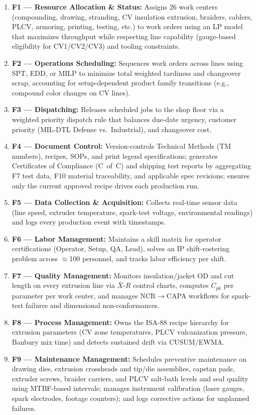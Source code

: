 \documentclass[11pt]{article}
\begin{document}
\begin{enumerate}[leftmargin=1.8em, itemsep=1pt]
\item \textbf{F1 --- Resource Allocation \& Status:} Assigns 26 work centers (compounding, drawing, stranding, CV insulation extrusion, braiders, cablers, PLCV, armoring, printing, testing, etc.) to work orders using an LP model that maximizes throughput while respecting line capability (gauge-based eligibility for CV1/CV2/CV3) and tooling constraints.
\item \textbf{F2 --- Operations Scheduling:} Sequences work orders across lines using SPT, EDD, or MILP to minimize total weighted tardiness and changeover scrap, accounting for setup-dependent product family transitions (e.g., compound color changes on CV lines).
\item \textbf{F3 --- Dispatching:} Releases scheduled jobs to the shop floor via a weighted priority dispatch rule that balances due-date urgency, customer priority (MIL-DTL Defense vs.\ Industrial), and changeover cost.
\item \textbf{F4 --- Document Control:} Version-controls Technical Methods (TM numbers), recipes, SOPs, and print legend specifications; generates Certificates of Compliance (C~of~C) and shipping test reports by aggregating F7 test data, F10 material traceability, and applicable spec revisions; ensures only the current approved recipe drives each production run.
\item \textbf{F5 --- Data Collection \& Acquisition:} Collects real-time sensor data (line speed, extruder temperature, spark-test voltage, environmental readings) and logs every production event with timestamps.
\item \textbf{F6 --- Labor Management:} Maintains a skill matrix for operator certifications (Operator, Setup, QA, Lead), solves an IP shift-rostering problem across $\approx$100 personnel, and tracks labor efficiency per shift.
\item \textbf{F7 --- Quality Management:} Monitors insulation/jacket OD and cut length on every extrusion line via $\bar{X}$-$R$ control charts, computes $C_{pk}$ per parameter per work center, and manages NCR$\to$CAPA workflows for spark-test failures and dimensional non-conformances.
\item \textbf{F8 --- Process Management:} Owns the ISA-88 recipe hierarchy for extrusion parameters (CV zone temperatures, PLCV vulcanization pressure, Banbury mix time) and detects sustained drift via CUSUM/EWMA.
\item \textbf{F9 --- Maintenance Management:} Schedules preventive maintenance on drawing dies, extrusion crossheads and tip/die assemblies, capstan pads, extruder screws, braider carriers, and PLCV salt-bath levels and seal quality using MTBF-based intervals; manages instrument calibration (laser gauges, spark electrodes, footage counters); and logs corrective actions for unplanned failures.

\end{enumerate}
\end{document}

